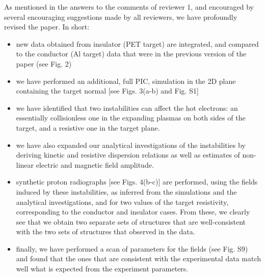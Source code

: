 \documentclass[aps,showpacs,superscriptaddress]{revtex4}%
\begin{document}
\begin{enumerate}
As mentioned in the answers to the comments of reviewer 1, and encouraged by several encouraging suggestions made by all reviewers, we have profoundly revised the paper. In short:
\begin{itemize}
    \item new data obtained from insulator (PET target) are integrated, and compared to the conductor (Al target) data that were in the previous version of the paper (see Fig. 2)
    \item we have performed an additional, full PIC, simulation in the 2D plane containing the target normal [see Figs. 3(a-b) and Fig. S1]
    \item we have identified that two instabilities can affect the hot electrons: an essentially  collisionless one in the expanding plasmas on both sides of the target, and a resistive one in the target plane. 
    \item we have also expanded our analytical investigations of the instabilities by deriving kinetic and resistive dispersion relations as well as  estimates of    non-linear electric and magnetic field amplitude.
    \item synthetic proton radiographs [see Figs. 4(b-c)] are performed, using the fields induced by these instabilities, as inferred from the simulations and the analytical investigations, and for two values of the target resistivity, corresponding to the conductor and insulator cases. From these, we clearly see that we obtain two separate sets of structures that are well-consistent with the two sets of structures that observed in the data. 
    \item finally, we have performed a scan of parameters for the fields (see Fig. S9) and found that the ones that are consistent with the experimental data match well what is expected from the experiment parameters. 
\end{itemize}


\end{enumerate}
\end{document}
